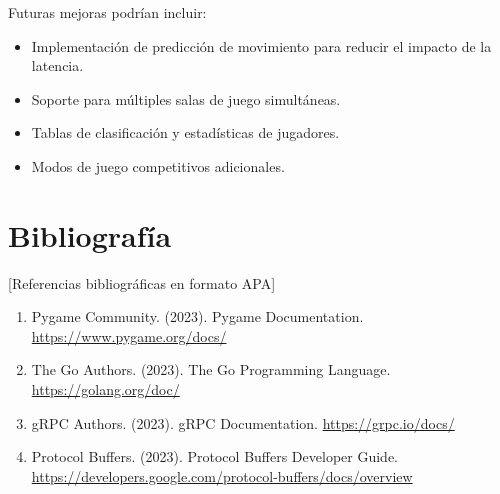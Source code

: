 \documentclass[12pt,letterpaper]{article}
\begin{document}
Futuras mejoras podrían incluir:

\begin{itemize}
    \item Implementación de predicción de movimiento para reducir el impacto de la latencia.
    \item Soporte para múltiples salas de juego simultáneas.
    \item Tablas de clasificación y estadísticas de jugadores.
    \item Modos de juego competitivos adicionales.
\end{itemize}

\section{Bibliografía}

[Referencias bibliográficas en formato APA]

\begin{enumerate}
    \item Pygame Community. (2023). Pygame Documentation. \url{https://www.pygame.org/docs/}
    \item The Go Authors. (2023). The Go Programming Language. \url{https://golang.org/doc/}
    \item gRPC Authors. (2023). gRPC Documentation. \url{https://grpc.io/docs/}
    \item Protocol Buffers. (2023). Protocol Buffers Developer Guide. \url{https://developers.google.com/protocol-buffers/docs/overview}
\end{enumerate}
\end{document}
